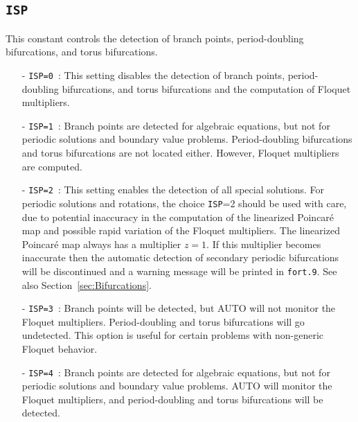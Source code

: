 \documentclass[12pt]{report}
\begin{document}
\subsection{\tt ISP}  \label{sec:ISP}
This constant controls the detection of branch points,
period-doubling bifurcations, and torus bifurcations. 
\begin{itemize}
\item[-] {\tt ISP=0}~:  
  This setting disables the detection of branch points, period-doubling 
  bifurcations, and torus bifurcations and the computation of 
  Floquet multipliers.
\item[-] {\tt ISP=1}~:  
  Branch points are detected for algebraic equations, but not for
  periodic solutions and boundary value problems.
  Period-doubling bifurcations and torus bifurcations are not located either.
  However, Floquet multipliers are computed.
\item[-] {\tt ISP=2}~: This setting enables the detection of all special 
 solutions.
 For periodic solutions and rotations, the choice {\tt ISP}=2 should be used with
 care, due to potential inaccuracy in the computation of the
 linearized Poincar\'e map and possible rapid variation of the
 Floquet multipliers.
 The linearized Poincar\'e map always has a multiplier $z=1$.
 If this multiplier becomes inaccurate
 then the automatic detection of secondary periodic
 bifurcations will be discontinued and a
 warning message will be printed in {\tt fort.9}.
 See also Section~\ref{sec:Bifurcations}.
\item[-] {\tt ISP=3}~:  
  Branch points will be detected, but {\cal AUTO} will not monitor the 
  Floquet multipliers. Period-doubling and torus bifurcations will go undetected. 
  This option is useful for certain problems with non-generic Floquet behavior.
\item[-] {\tt ISP=4}~:  
  Branch points are detected for algebraic equations, but not for
  periodic solutions and boundary value problems.
  {\cal AUTO} will monitor the Floquet multipliers, and period-doubling
  and torus bifurcations will be detected.
\end{itemize}
\end{document}

